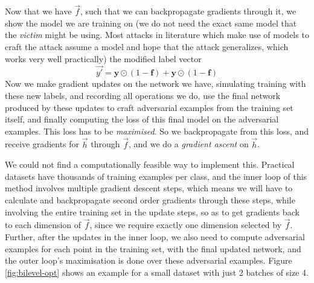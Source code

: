 \documentclass{ociamthesis}
\begin{document}
Now that we have $\vec{f}$, such that we can backpropagate gradients through it,
we show the model we are training on (we do not need the exact same model that
the \emph{victim} might be using. Most attacks in literature which make use of
models to craft the attack assume a model and hope that the attack generalizes,
which works very well practically) the modified label vector
\begin{equation*}
    \vec{y'} = \textbf{y}\odot(1-\textbf{f})+\textbf{y}\odot(1-\textbf{f})
\end{equation*}
Now we make gradient updates on the network we have, simulating training with
these new labels, and recording all operations we do, use the final network
produced by these updates to craft adversarial examples from the training set
itself, and finally computing the loss of this final model on the adversarial
examples. This loss has to be \emph{maximised}. So we backpropagate from this
loss, and receive gradients for $\vec{h}$ through $\vec{f}$, and we do a
\emph{gradient ascent} on $\vec{h}$.

We could not find a computationally feasible way to implement this. Practical
datasets have thousands of training examples per class, and the inner loop of
this method involves multiple gradient descent steps, which means we will have
to calculate and backpropagate second order gradients through these steps, while
involving the entire training set in the update steps, so as to get gradients
back to each dimension of $\vec{f}$, since we require exactly one dimension
selected by $\vec{f}$. Further, after the updates in the inner loop, we also
need to compute adversarial examples for each point in the training set, with
the final updated network, and the outer loop's maximisation is done over these
adversarial examples. Figure \ref{fig:bilevel-opt} shows an example for a small
dataset with just 2 batches of size 4.
\end{document}
